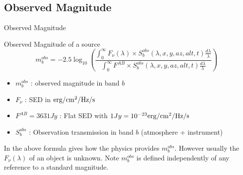 \documentclass{beamer}
\begin{document}
\subsection{Observed Magnitude}
\begin{frame}{Observed Magnitude}
\begin{alertblock}{Observed Magnitude of a source}
	\begin{equation}
	m^{obs}_b = -2.5 \log_{10}\left( 
	\frac{\int_0^\infty F_\nu(\lambda) \times S_b^{obs}(\lambda,x,y,az,alt,t) \frac{d\lambda}{\lambda} }{\int_0^\infty F^{AB} \times S_b^{obs}(\lambda,x,y,az,alt,t) \frac{d\lambda}{\lambda}} 
	\right)
	\end{equation}
	\begin{itemize}
	\item $m^{obs}_b$ : observed magnitude in band $b$
	\item $F_\nu$ : SED in ${\rm erg/cm^2/Hz/s}$
	\item $F^{AB}=3631 Jy$ : Flat SED with $1 Jy = 10^{-23} {\rm erg/cm^2/Hz/s}$
	\item $S_b^{obs}$ : Observation transmission in band $b$  (atmosphere + instrument)
	\end{itemize}
	\end{alertblock}	
In the above formula gives how the physics provides $m_b^{obs}$. However usually the $F_\nu(\lambda)$ of an object is unknown.	
Note $m^{obs}_b$ is defined independently of any reference to a standard magnitude.
\end{frame}
\end{document}

